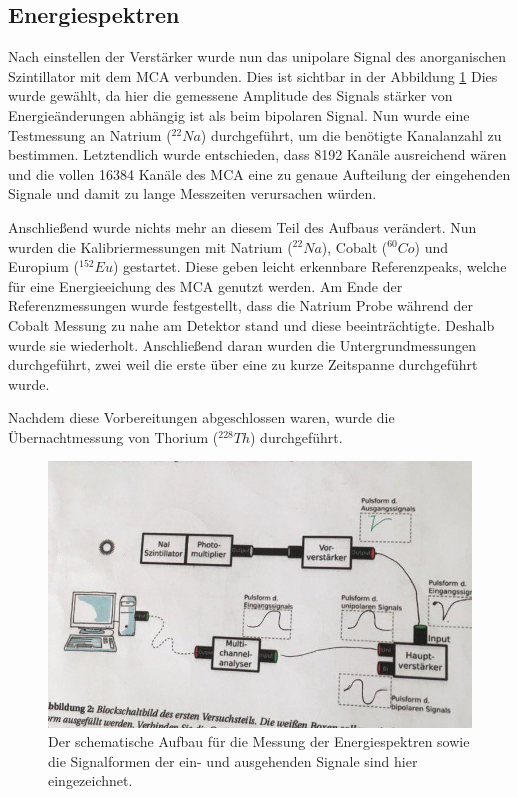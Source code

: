 \subsection{Energiespektren}
Nach einstellen der Verstärker wurde nun das unipolare Signal des anorganischen Szintillator mit dem MCA verbunden. Dies ist sichtbar in der Abbildung \ref{schaltung_energie} Dies wurde gewählt, da hier die  gemessene Amplitude des Signals stärker von Energieänderungen abhängig ist als beim bipolaren Signal. Nun wurde eine Testmessung an Natrium ($^{22}Na$) durchgeführt, um die benötigte Kanalanzahl zu bestimmen. Letztendlich wurde entschieden, dass 8192 Kanäle ausreichend wären und die vollen 16384 Kanäle des MCA eine zu genaue Aufteilung der eingehenden Signale und damit zu lange Messzeiten verursachen würden.\par
Anschließend wurde nichts mehr an diesem Teil des Aufbaus verändert. Nun wurden die Kalibriermessungen mit Natrium ($^{22}Na$), Cobalt ($^{60}Co$) und Europium ($^{152}Eu$) gestartet. Diese geben leicht erkennbare Referenzpeaks, welche für eine Energieeichung des MCA genutzt werden. Am Ende der Referenzmessungen wurde festgestellt, dass die Natrium Probe während der Cobalt Messung zu nahe am Detektor stand und diese beeinträchtigte. Deshalb wurde sie wiederholt. Anschließend daran wurden die Untergrundmessungen durchgeführt, zwei weil die erste über eine zu kurze Zeitspanne durchgeführt wurde.\par
Nachdem diese Vorbereitungen abgeschlossen waren, wurde die Übernachtmessung von Thorium ($^{228}Th$) durchgeführt. 

\begin{figure}[h]
	\centering
	\includegraphics[scale=0.5]{Bilder/schaltung_energie}
	\caption[Schematischer Aufbau zur Energiemessung]{\small Der schematische Aufbau für die Messung der Energiespektren sowie die Signalformen der ein- und ausgehenden Signale sind hier eingezeichnet.}
	\label{schaltung_energie}
\end{figure}

